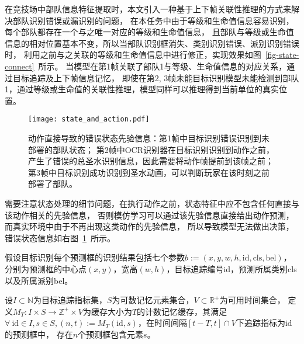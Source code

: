 在竞技场中部队信息特征提取时，本文引入一种基于上下帧关联性推理的方式来解决部队识别错误或漏识别的问题，
在本任务中由于等级和生命值信息容易识别，每个部队都存在一个与之唯一对应的等级和生命值信息，
且部队与等级或生命值信息的相对位置基本不变，所以当部队识别框消失、类别识别错误、派别识别错误时，
利用之前与之关联的等级和生命值信息中进行修正，实现效果如图~\ref{fig-state-connect}~所示。
当模型在第1帧关联了部队1与等级、生命值信息的对应关系，通过目标追踪及上下帧信息记忆，
即使在第2, 3帧未能目标识别模型未能检测到部队1，通过等级或生命值的关联性推理，模型同样可以推理得到当前单位的真实位置。
\begin{figure}[htbp]
  \centering\vspace{-1ex}
  \texttt{[image: state\_and\_action.pdf]}
  \vspace{4ex}
  \caption{动作直接导致的错误状态先验信息：第1帧中目标识别错误识别到未部署的部队状态；
  第2帧中OCR识别器在目标识别识别到动作之前，产生了错误的总圣水识别信息，因此需要将动作帧提前到该帧之前；
  第3帧中目标识别成功识别到圣水动画，可以判断玩家在该时刻之前部署了部队。}
  \label{fig-state-action}
\end{figure}

需要注意状态处理的细节问题，在执行动作之前，状态特征中应不包含任何直接与该动作相关的先验信息，
否则模仿学习可以通过该先验信息直接给出动作预测，而真实环境中由于不再出现这类动作的先验信息，
所以导致模型无法做出决策，错误状态信息如右图~\ref{fig-state-action}~所示。

假设目标识别每个预测框的识别结果包括七个参数$b:=(x,y,w,h,\text{id},\text{cls},\text{bel})$，
分别为预测框的中心点$(x,y)$，宽高$(w,h)$，目标追踪编号id，预测所属类别cls以及所属派别bel。

\begin{definition}[计数记忆缓存]
  设$I\subset \mathbb{N}$为目标追踪指标集，$S$为可数记忆元素集合，$V\subset \mathbb{R}^+$为可用时间集合，
  定义$M_{T}:I\times S\to\mathbb{Z}^+\times V$为缓存大小为$T$的计数记忆缓存，其满足
  $\forall~ \text{id}\in I, s\in S, (n,t):=M_T(\text{id},s)$，在时间间隔$[t-T,t]\cap V$下追踪指标为id的预测框中，
  存在$n$个预测框包含元素$s$。
\end{definition}

